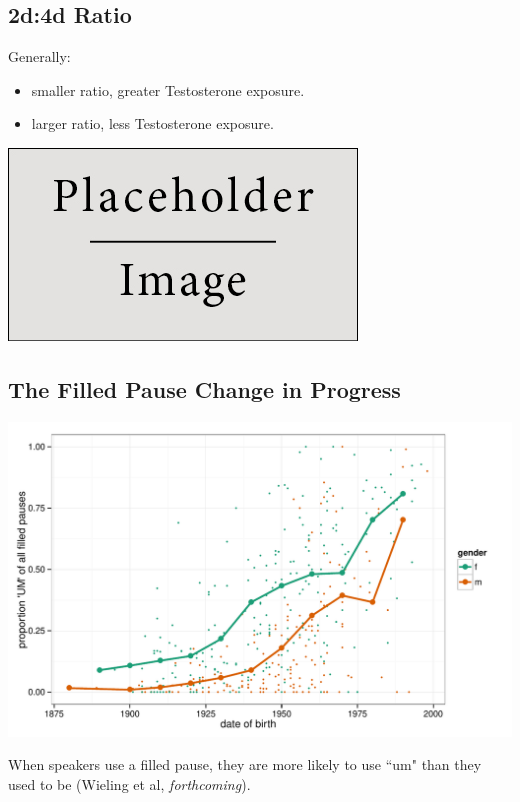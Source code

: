 \documentclass[a0,portrait]{a0poster}
\begin{document}
\begin{multicols}{2}
\subsection*{2d:4d Ratio}
Generally:

\begin{itemize}
	\item smaller ratio, greater Testosterone exposure.
	\item larger ratio, less Testosterone exposure.
\end{itemize}
\begin{center}\vspace{1cm}
\includegraphics[width=0.8\linewidth]{placeholder}
\end{center}\vspace{1cm}


\subsection*{The Filled Pause Change in Progress}
\begin{minipage}[c]{0.70\linewidth}
\includegraphics[width=1\linewidth]{um.pdf}
\end{minipage}
%
\begin{minipage}[c]{0.25\linewidth}
\large
When speakers use a filled pause, they are more likely to use ``um" than they used to be  (Wieling et al, \textsl{forthcoming}).
\end{minipage}





\end{multicols}
\end{document}
